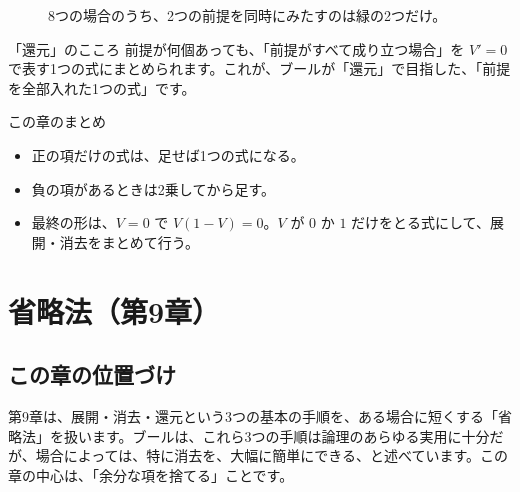 \documentclass[a4paper,11pt,openany]{ltjsbook}
\begin{document}
\begin{figure}[htbp]
\centering
{}
\caption{8つの場合のうち、2つの前提を同時にみたすのは緑の2つだけ。}
\end{figure}

\begin{pointbox}{「還元」のこころ}
前提が何個あっても、「前提がすべて成り立つ場合」を $V'=0$ で表す1つの式にまとめられます。これが、ブールが「還元」で目指した、「前提を全部入れた1つの式」です。
\end{pointbox}

\begin{pointbox}{この章のまとめ}
\begin{itemize}[leftmargin=*]
\item 正の項だけの式は、足せば1つの式になる。
\item 負の項があるときは2乗してから足す。
\item 最終の形は、$V=0$ で $V(1-V)=0$。$V$ が $0$ か $1$ だけをとる式にして、展開・消去をまとめて行う。
\end{itemize}
\end{pointbox}

\chapter{省略法（第9章）}

\section{この章の位置づけ}

第9章は、展開・消去・還元という3つの基本の手順を、ある場合に短くする「省略法」を扱います。ブールは、これら3つの手順は論理のあらゆる実用に十分だが、場合によっては、特に消去を、大幅に簡単にできる、と述べています。この章の中心は、「余分な項を捨てる」ことです。
\end{document}
